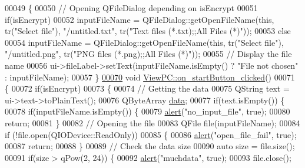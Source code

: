 \begin{DoxyCode}
00049 \{
00050     \textcolor{comment}{// Opening QFileDialog depending on isEncrypt}
00051     \textcolor{keywordflow}{if}(isEncrypt)
00052         inputFileName = QFileDialog::getOpenFileName(\textcolor{keyword}{this}, tr(\textcolor{stringliteral}{"Select file"}), \textcolor{stringliteral}{"/untitled.txt"}, tr(\textcolor{stringliteral}{"Text
       files (*.txt);;All Files (*)"}));
00053     \textcolor{keywordflow}{else}
00054         inputFileName = QFileDialog::getOpenFileName(\textcolor{keyword}{this}, tr(\textcolor{stringliteral}{"Select file"}), \textcolor{stringliteral}{"/untitled.png"}, tr(\textcolor{stringliteral}{"PNG
       files (*.png);;All Files (*)"}));
00055     \textcolor{comment}{// Display the file name}
00056     ui->fileLabel->setText(inputFileName.isEmpty() ? \textcolor{stringliteral}{"File not chosen"} : inputFileName);
00057 \}
\hypertarget{viewpc_8cpp_source.tex_l00070}{}\hyperlink{class_view_p_c_a456d75b7c5d3a089302a576e7359f1f4}{00070} \textcolor{keywordtype}{void} \hyperlink{class_view_p_c_a456d75b7c5d3a089302a576e7359f1f4}{ViewPC::on\_startButton\_clicked}()
00071 \{
00072     \textcolor{keywordflow}{if}(isEncrypt)
00073     \{
00074         \textcolor{comment}{// Getting the data}
00075         QString text = ui->text->toPlainText();
00076         QByteArray \hyperlink{namespace_errors_dict_setup_af570460846fb9f0c91abd308a095dcdc}{data};
00077         \textcolor{keywordflow}{if}(text.isEmpty()) \{
00078             \textcolor{keywordflow}{if}(inputFileName.isEmpty()) \{
00079                 \hyperlink{class_view_p_c_a7c467169467789561078abc9d4fe57bd}{alert}(\textcolor{stringliteral}{"no\_input\_file"}, \textcolor{keyword}{true});
00080                 \textcolor{keywordflow}{return};
00081             \}
00082             \textcolor{comment}{// Opening the file}
00083             QFile file(inputFileName);
00084             \textcolor{keywordflow}{if} (!file.open(QIODevice::ReadOnly))
00085             \{
00086                 \hyperlink{class_view_p_c_a7c467169467789561078abc9d4fe57bd}{alert}(\textcolor{stringliteral}{"open\_file\_fail"}, \textcolor{keyword}{true});
00087                 \textcolor{keywordflow}{return};
00088             \}
00089             \textcolor{comment}{// Check the data size}
00090             \textcolor{keyword}{auto} size = file.size();
00091             \textcolor{keywordflow}{if}(size > qPow(2, 24)) \{
00092                 \hyperlink{class_view_p_c_a7c467169467789561078abc9d4fe57bd}{alert}(\textcolor{stringliteral}{"muchdata"}, \textcolor{keyword}{true});
00093                 file.close();

\end{DoxyCode}
